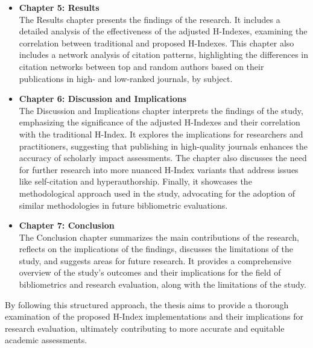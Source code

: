 \begin{itemize}
      \item \textbf{Chapter 5: Results} \\
            The Results chapter presents the findings of the research.
            It includes a detailed analysis of the effectiveness of the adjusted H-Indexes,
            examining the correlation between traditional and proposed H-Indexes.
            This chapter also includes a network
            analysis of citation patterns, highlighting the differences in citation networks between
            top and random authors based on their publications in high- and low-ranked journals,
            by subject.

      \item \textbf{Chapter 6: Discussion and Implications} \\
            The Discussion and Implications chapter interprets the findings of the study,
            emphasizing the significance of the adjusted H-Indexes and their correlation
            with the traditional H-Index. It explores the implications for researchers and practitioners,
            suggesting that publishing in high-quality journals enhances the accuracy of scholarly impact assessments.
            The chapter also discusses the need for further research into more nuanced H-Index variants that address issues
            like self-citation and hyperauthorship. Finally, it showcases the methodological approach used in the study,
            advocating for the adoption of similar methodologies in future bibliometric evaluations.

      \item \textbf{Chapter 7: Conclusion} \\
            The Conclusion chapter summarizes the main contributions of the research,
            reflects on the implications of the findings, discusses the limitations of the study,
            and suggests areas for future research. It provides a comprehensive overview of the study's
            outcomes and their implications for the field of bibliometrics and research evaluation, along
            with the limitations of the study.
\end{itemize}

By following this structured approach, the thesis aims to provide a thorough
examination of the proposed H-Index implementations and their implications for
research evaluation, ultimately contributing to more accurate and equitable
academic assessments.

